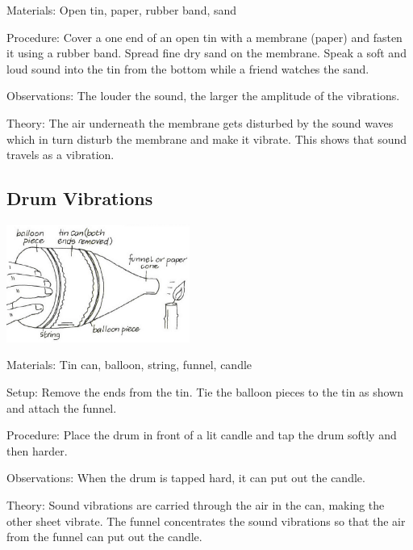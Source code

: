 \begin{multicols}{2}
\begin{description*}
\item[Materials:]{Open tin, paper, rubber band, sand}
\item[Procedure:]{Cover a one end of an open tin with a membrane (paper) and fasten it using a rubber band. Spread fine dry sand on the membrane. Speak a soft and loud sound into the tin from the bottom while a friend watches the sand.}
\item[Observations:]{The louder the sound, the larger the amplitude of the vibrations.}
\item[Theory:]{The air underneath the membrane gets disturbed by the sound waves which in turn disturb the membrane and make it vibrate. This shows that sound travels as a vibration.}
\end{description*}

\subsection{Drum Vibrations}

\begin{center}
\includegraphics[width=0.45\textwidth]{./img/vso/drum-vibrations.png}
\end{center}

\begin{description*}
\item[Materials:]{Tin can, balloon, string, funnel, candle}
\item[Setup:]{Remove the ends from the tin. Tie the balloon pieces to the tin as shown and attach the funnel.}
\item[Procedure:]{Place the drum in front of a lit candle and tap the drum softly and then harder.}
\item[Observations:]{When the drum is tapped hard, it can put out the candle.}
\item[Theory:]{Sound vibrations are carried through the air in the can, making the other sheet vibrate. The funnel concentrates the sound vibrations so that the air from the funnel can put out the candle.}
\end{description*}


\end{multicols}
